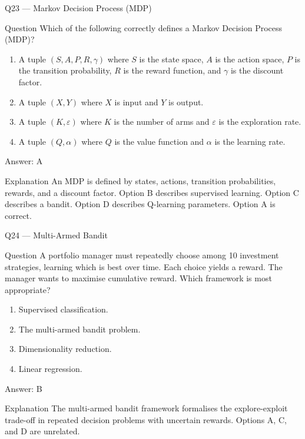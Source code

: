 \documentclass[aspectratio=169,8pt]{beamer}
\begin{document}
	\begin{frame}{Q23 --- Markov Decision Process (MDP)}
		\begin{block}{Question}
			Which of the following correctly defines a Markov Decision Process (MDP)?
			\begin{enumerate}
				\item A tuple $(S, A, P, R, \gamma)$ where $S$ is the state space, $A$ is the action space, $P$ is the transition probability, $R$ is the reward function, and $\gamma$ is the discount factor.
				\item A tuple $(X, Y)$ where $X$ is input and $Y$ is output.
				\item A tuple $(K, \varepsilon)$ where $K$ is the number of arms and $\varepsilon$ is the exploration rate.
				\item A tuple $(Q, \alpha)$ where $Q$ is the value function and $\alpha$ is the learning rate.
			\end{enumerate}
		\end{block}
		\begin{exampleblock}{Answer: A}\end{exampleblock}
		\begin{block}{Explanation}
			An MDP is defined by states, actions, transition probabilities, rewards, and a discount factor. Option B describes supervised learning. Option C describes a bandit. Option D describes Q-learning parameters. Option A is correct.
		\end{block}
	\end{frame}
	
	\begin{frame}{Q24 --- Multi-Armed Bandit}
		\begin{block}{Question}
			A portfolio manager must repeatedly choose among 10 investment strategies, learning which is best over time. Each choice yields a reward. The manager wants to maximise cumulative reward. Which framework is most appropriate?
			\begin{enumerate}
				\item Supervised classification.
				\item The multi-armed bandit problem.
				\item Dimensionality reduction.
				\item Linear regression.
			\end{enumerate}
		\end{block}
		\begin{exampleblock}{Answer: B}\end{exampleblock}
		\begin{block}{Explanation}
			The multi-armed bandit framework formalises the explore-exploit trade-off in repeated decision problems with uncertain rewards. Options A, C, and D are unrelated.
		\end{block}
	\end{frame}
	
\end{document}
